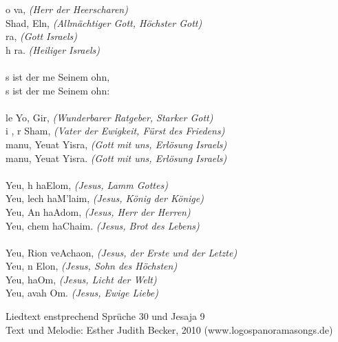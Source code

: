 \begin{tabbing}
o va,  \hspace{90px} \= \textit{(Herr der Heerscharen)}\\
 Shad,  Eln, \>   \textit{(Allmächtiger Gott, Höchster Gott)}\\
 ra, 	\>   \textit{(Gott Israels)}\\                                              
h ra. 	     \>      \textit{(Heiliger Israels)}\\
\\
s ist der me  Seinem ohn,\\
s ist der me  Seinem ohn:\\
\\
le Yo,  Gir, \>	   \textit{(Wunderbarer Ratgeber, Starker Gott)}\\	
i , r Sham, \>   \textit{(Vater der Ewigkeit, Fürst des Friedens)}\\	
manu, Yeuat Yisra, \> \textit{(Gott mit uns, Erlösung Israels)}\\
manu, Yeuat Yisra. \> \textit{(Gott mit uns, Erlösung Israels)}\\
\\
Yeu, h haElom, \>  \textit{(Jesus, Lamm Gottes)}\\	
Yeu, lech haM'laim, \> \textit{(Jesus, König der Könige)}\\
Yeu, An haAdom, 	\>  \textit{(Jesus, Herr der Herren)}\\	
Yeu,  chem haChaim.\> \textit{(Jesus, Brot des Lebens)}\\
\\
Yeu, Rion veAchaon,\> \textit{(Jesus, der Erste und der Letzte)}\\
Yeu, n Elon, \> \textit{(Jesus, Sohn des Höchsten)}\\
Yeu,  haOm, \> \textit{(Jesus, Licht der Welt)}\\
Yeu, avah Om. \> \textit{(Jesus, Ewige Liebe)}\\
\end{tabbing}

\begin{footnotesize}
Liedtext enstprechend Sprüche 30 und Jesaja 9\\
Text und Melodie: Esther Judith Becker, 2010 (www.logospanoramasongs.de)
\end{footnotesize}